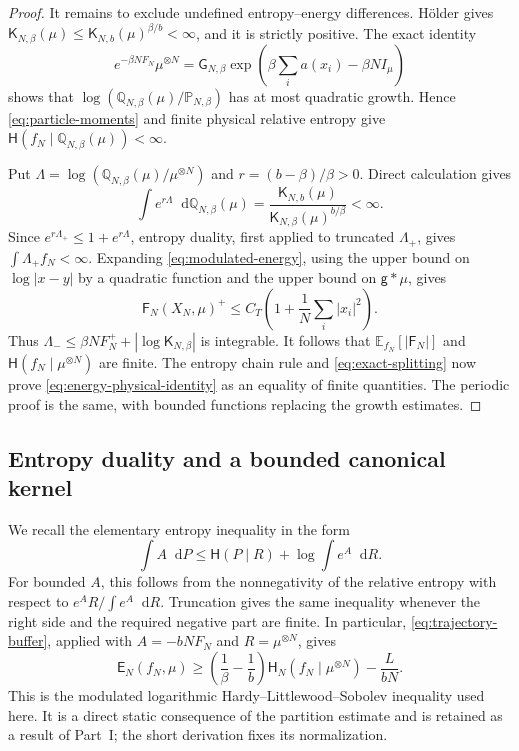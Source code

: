 \documentclass[11pt,reqno]{amsart}
\numberwithin{equation}{section}
\theoremstyle{definition}
\theoremstyle{remark}
\newcommand{\E}{\mathbb E}
\newcommand{\g}{\mathsf g}
\newcommand{\Hr}{\mathsf H}
\newcommand{\Fr}{\mathsf F}
\newcommand{\Er}{\mathsf E}
\newcommand{\K}{\mathsf K}
\newcommand{\Q}{\mathbb Q}
\newcommand{\Pb}{\mathbb P}
\newcommand{\G}{\mathsf G}
\newcommand{\dd}{\mathop{}\!\mathrm d}
\begin{document}
\begin{proof}
It remains to exclude undefined entropy--energy differences. H\"older gives $\K_{N,\beta}(\mu)\leq \K_{N,b}(\mu)^{\beta/b}<\infty$, and it is strictly positive. The exact identity
\begin{equation}\label{eq:reference-factorization}
 e^{-\beta NF_N}\mu^{\otimes N}
 =\G_{N,\beta}\exp\!\left(\beta\sum_i a(x_i)-\beta NI_\mu\right)
\end{equation}
shows that $\log(\Q_{N,\beta}(\mu)/\Pb_{N,\beta})$ has at most quadratic growth. Hence \eqref{eq:particle-moments} and finite physical relative entropy give $\Hr(f_N\mid \Q_{N,\beta}(\mu))<\infty$.

Put $\Lambda=\log(\Q_{N,\beta}(\mu)/\mu^{\otimes N})$ and $r=(b-\beta)/\beta>0$. Direct calculation gives
\begin{equation}\label{eq:reference-renyi}
 \int e^{r\Lambda}\dd \Q_{N,\beta}(\mu)
 =\frac{\K_{N,b}(\mu)}{\K_{N,\beta}(\mu)^{b/\beta}}<\infty.
\end{equation}
Since $e^{r\Lambda_+}\leq1+e^{r\Lambda}$, entropy duality, first applied to truncated $\Lambda_+$, gives $\int\Lambda_+ f_N<\infty$. Expanding \eqref{eq:modulated-energy}, using the upper bound on $\log|x-y|$ by a quadratic function and the upper bound on $\g*\mu$, gives
\begin{equation}\label{eq:positive-energy-bound}
 \Fr_N(X_N,\mu)^+\leq C_T\left(1+\frac1N\sum_i|x_i|^2\right).
\end{equation}
Thus $\Lambda_-\leq\beta NF_N^++|\log \K_{N,\beta}|$ is integrable. It follows that $\E_{f_N}[|\Fr_N|]$ and $\Hr(f_N\mid\mu^{\otimes N})$ are finite. The entropy chain rule and \eqref{eq:exact-splitting} now prove \eqref{eq:energy-physical-identity} as an equality of finite quantities. The periodic proof is the same, with bounded functions replacing the growth estimates.
\end{proof}

\subsection{Entropy duality and a bounded canonical kernel}
We recall the elementary entropy inequality in the form
\begin{equation}\label{eq:entropy-duality}
 \int A\dd P\leq \Hr(P\mid R)+\log\int e^A\dd R.
\end{equation}
For bounded $A$, this follows from the nonnegativity of the relative entropy with respect to $e^AR/\int e^A\dd R$. Truncation gives the same inequality whenever the right side and the required negative part are finite. In particular, \eqref{eq:trajectory-buffer}, applied with $A=-bNF_N$ and $R=\mu^{\otimes N}$, gives
\begin{equation}\label{eq:duality-coercivity}
 \Er_N(f_N,\mu)\geq\left(\frac1\beta-\frac1b\right)\Hr_N(f_N\mid\mu^{\otimes N})-\frac{L}{bN}.
\end{equation}
This is the modulated logarithmic Hardy--Littlewood--Sobolev inequality used here. It is a direct static consequence of the partition estimate and is retained as a result of Part~I; the short derivation fixes its normalization.
\end{document}
